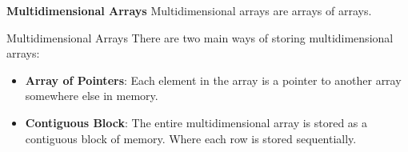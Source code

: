 
\begin{frame}{\textbf{Multidimensional Arrays}}
    Multidimensional arrays are arrays of arrays.
    \begin{block}{Multidimensional Arrays}
        There are two main ways of storing multidimensional arrays:
        \begin{itemize}
            \item \textbf{Array of Pointers}: Each element in the array is a pointer to another array somewhere else in memory.
            \item \textbf{Contiguous Block}: The entire multidimensional array is stored as a contiguous block of memory. Where each row is stored sequentially.
        \end{itemize}
    \end{block}
\end{frame}

